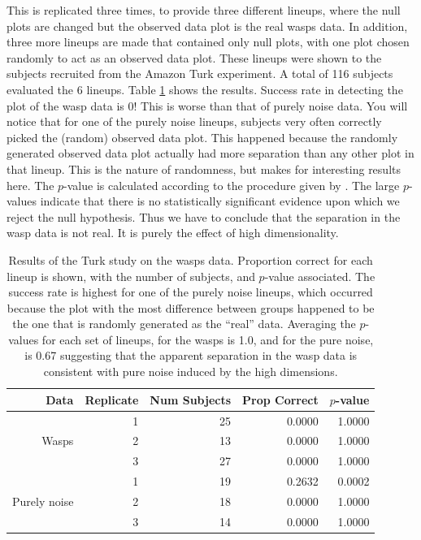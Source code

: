 This is replicated three times, to provide three different lineups, where the null plots are changed but the observed data plot is the real wasps data. In addition, three more lineups are made that contained only null plots, with one plot chosen randomly to act as an observed data plot. These lineups were shown to the subjects recruited from the Amazon Turk experiment.  A total of 116 subjects evaluated the 6 lineups. Table \ref{wasp} shows the results. Success rate in detecting the plot of the wasp data is 0! This is worse than that of purely noise data. You will notice that for one of the purely noise lineups, subjects very often correctly picked the (random) observed data plot. This happened because the randomly generated observed data plot actually had more separation than any other plot in that lineup. This is the nature of randomness, but makes for interesting results here. The $p$-value is calculated according to the procedure given by \cite{majumder:2011}. The large $p$-values indicate that there is no statistically significant evidence upon which we reject the null hypothesis. Thus we have to conclude that the separation in the wasp data is not real. It is purely the effect of high dimensionality. 

\begin{table}[ht]
\begin{center}
\caption{Results of the Turk study on the wasps data. Proportion correct for each lineup is shown, with the number of subjects, and $p$-value associated. The success rate is highest for one of the purely noise lineups, which occurred because the plot with the most difference between groups happened to be the one that is randomly generated as the ``real'' data. Averaging the $p$-values for each set of lineups, for the wasps is 1.0, and for the pure noise, is 0.67 suggesting that the apparent separation in the wasp data is consistent with pure noise induced by the high dimensions.}
\vspace{0.15cm}
\begin{tabular}{r|r|r|rr}
\hline
  \hline
 Data & Replicate & Num Subjects & Prop Correct & $p$-value\\ 
  \hline
  & 1 & 25 & 0.0000 &  1.0000\\
Wasps & 2 & 13 & 0.0000 &  1.0000\\ 
 & 3 & 27 & 0.0000 &  1.0000\\
 \hline
 & 1 & 19 & 0.2632 &  0.0002\\
Purely noise & 2 & 18 & 0.0000 &  1.0000 \\ 
 & 3 & 14 & 0.0000 &  1.0000\\
   \hline
\end{tabular}
\label{wasp}
\end{center}
\end{table}

